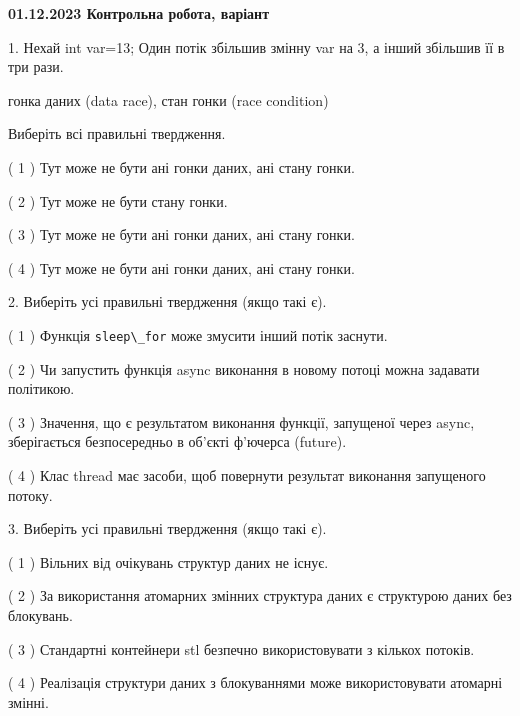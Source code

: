 \documentclass[12pt, ukrainian]{article}
\def\code#1{\Verb!#1!}
\begin{document}
\vspace{4mm}
\newpage
\begin {large}

\textbf{01.12.2023 Контрольна робота, варіант  }\par


{
1. Нехай int var=13; Один потік збільшив змінну var на 3, а інший збільшив її в три рази.

гонка даних (data race), стан гонки (race condition)

Виберіть всі правильні твердження.\par
\vspace{2mm}
( 1 ) Тут може не бути ані гонки даних, ані стану гонки.%

( 2 ) Тут може не бути стану гонки.%

( 3 ) Тут може не бути ані гонки даних, ані стану гонки.%

( 4 ) Тут може не бути ані гонки даних, ані стану гонки.%


\vspace{5mm}
2. Виберіть усі правильні твердження (якщо такі є).\par
\vspace{2mm}

( 1 ) Функція \code{sleep\_for} може змусити інший потік заснути.%

( 2 ) Чи запустить функція  async виконання в новому потоці можна задавати політикою.%

( 3 ) Значення, що є результатом виконання функції, запущеної через async, зберігається безпосередньо в об’єкті ф’ючерса (future).%

( 4 ) Клас thread має засоби, щоб повернути результат виконання запущеного потоку.%


\vspace{5mm}
3. Виберіть усі правильні твердження (якщо такі є).\par
\vspace{2mm}

( 1 ) Вільних від очікувань структур даних не існує.%

( 2 ) За використання атомарних змінних структура даних є структурою даних без блокувань.%

( 3 ) Стандартні контейнери stl безпечно використовувати з кількох потоків.%

( 4 ) Реалізація структури даних з блокуваннями може використовувати атомарні змінні.%


}
\end{large}
\end{document}
